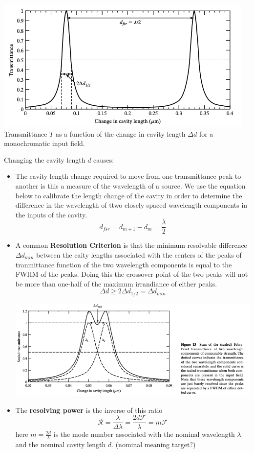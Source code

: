\documentclass[10pt]{article}
\begin{document}
\begin{center}
    \includegraphics*[scale = .5]{imgs/cavity-change-vs-trans.png} \\ 
    Transmittance $T$ as a function of the change in cavity length $\Delta d$ for a
monochromatic input field.
\end{center}
Changing the cavity length $d$ causes:
\begin{itemize}
    \item The cavity length change required to move from one transmittance peak to another is this a measure of the wavelength of a source. We use the equation below to calibrate the length change of the cavity in order to determine the difference in the wavelength of ttwo closely spaced wavelength components in the inputs of the cavity. 
    \[d_{fsr} = d_{m+1} - d_{m} = \frac{\lambda}{2}\]
    \item A common \textbf{Resolution Criterion} is that the minimum resolvable difference $\Delta d_{min}$ between the caity lengths associated with the centers of the peaks of tranmittance function of the two wavelength components is equal to the FWHM of the peaks. Doing this the crossover point of the two peaks will not be more than one-half of the maximum irrandiance of either peaks.
    \[\Delta d \ge 2 \Delta d_{1/2} = \Delta d_{min}\]
    \begin{center}
        \includegraphics*[scale = .6]{imgs/resolution-creiterion.png}
    \end{center}
    \item The \textbf{resolving power} is the inverse of this ratio
    \[\mathcal{R} = \frac{\lambda}{\Delta \lambda} = \frac{2d\mathcal{F}}{\lambda} = m \mathcal{F} \]
    here $m = \frac{2d}{\lambda}$ is the mode number associated with the nominal wavelength $\lambda$ and the nominal cavity length $d$. (nominal meaning target?)
\end{itemize}
\end{document}
